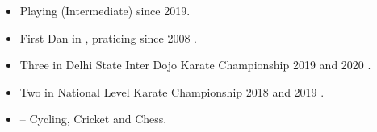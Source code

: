 


\begin{itemize}

\item Playing {\color{black}{Guitar}} (Intermediate) since 2019.
\smallskip
\item First Dan {\color{black}{Black Belt}} in {\color{black}{Karate}}, praticing since 2008 \hspace{0.02cm}\href{https://drive.google.com/file/d/1JoKezafJ_j58_FUGwm4_MW-CSWOgB9Iq/view?usp=sharing}{\color{coolblack}{\ExternalLink}}.
\smallskip
\item Three {\color{black}{Gold Medals}} in Delhi State Inter Dojo Karate Championship 2019 and 2020 \hspace{0.02cm}\href{https://drive.google.com/file/d/1Jv4oj5L4ObkZ6nZMxcPOHJBW1GapOsXq/view?usp=sharing}{\color{coolblack}{\ExternalLink}}.
\item Two {\color{black}{Bronze Medals}} in National Level Karate Championship 2018 and 2019 \hspace{0.02cm}\href{https://drive.google.com/file/d/1JwTKwOhlYg8OSZzhLZ06Uf-Zfi4yDrQw/view?usp=sharing}{\color{coolblack}{\ExternalLink}}.
\smallskip
\item {\color{black}{Other Areas of Interest}} -- Cycling, Cricket and Chess.

\end{itemize}